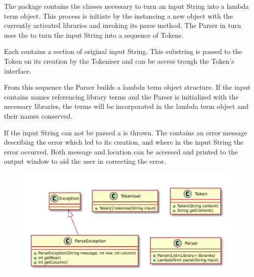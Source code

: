 The \texttt{} package contains the classes necessary to turn an input String into a lambda term object.
This process is initiate by the \texttt{} instancing a new \texttt{} object with the currently activated libraries and invoking its parse method. The Parser in turn uses the \texttt{} to turn the input String into a sequence of Tokens. 

Each \texttt{} contains a section of original input String. This substring is passed to the Token on its creation by the Tokeniser and can be access trough the Token's interface.

From this sequence the Parser builds a lambda term object structure.
If the input contains names referencing library terms and the Parser is initialized with the necessary libraries, the terms will be incorporated in the lambda term object and their names conserved.
 
If the input String can not be parsed a \texttt{} is thrown.
The \texttt{} contains an error message describing the error which led to its creation, and where in the input String the error occurred.
Both message and location can be accessed and printed to the output window to aid the user in correcting the error.

\begin{figure}[H]
	\centering
	\includegraphics[width=\textwidth]{packageDiagrams/parsingPackage}
\end{figure}
